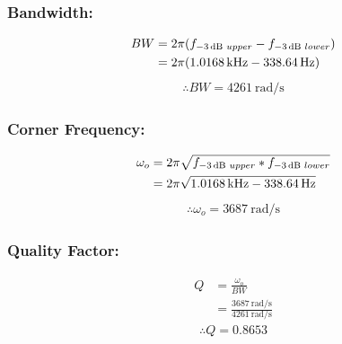 \documentclass[hidelinks]{article}
\begin{document}
	\subsubsection*{Bandwidth:}
	\begin{align}
		BW &= 2\pi (f_{\SI{-3}{\decibel}\hspace{1mm} upper} - f_{\SI{-3}{\decibel}\hspace{1mm} lower})\\
		&= 2\pi (\SI{1.0168}{k\hertz} - \SI{338.64}{\hertz}) \nonumber
	\end{align}
	\begin{align*}
		\therefore BW = \SI{4261}{\radian/ \second}
	\end{align*}
	\subsubsection*{Corner Frequency:}
	\begin{align}
		\omega_o &= 2\pi \sqrt{f_{\SI{-3}{\decibel}\hspace{1mm} upper} * f_{\SI{-3}{\decibel}\hspace{1mm} lower}}\\
		&= 2\pi \sqrt{\SI{1.0168}{k\hertz} - \SI{338.64}{\hertz}} \nonumber
	\end{align}
	\begin{align*}
		\therefore \omega_o = \SI{3687}{\radian/ \second}
	\end{align*}
	\subsubsection*{Quality Factor:}
	\begin{align}
		Q &= \frac{\omega_o}{BW}\\
		&= \frac{\SI{3687}{\radian/ \second}}{\SI{4261}{\radian/ \second}} \nonumber
	\end{align}
	\begin{align*}
		\therefore Q = 0.8653
	\end{align*}
\end{document}
